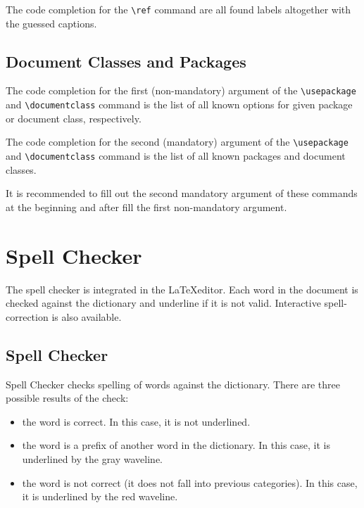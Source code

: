 \documentclass{article}
\begin{document}
\label{ssec:references}

The code completion for the \verb+\ref+ command are all found labels altogether with
the guessed captions.

\subsection{Document Classes and Packages}

\label{ssec:docclasses:packages}

The code completion for the first (non-mandatory) argument of the \verb+\usepackage+
and \verb+\documentclass+ command is the list of all known options for given package
or document class, respectively.

The code completion for the second (mandatory) argument of the \verb+\usepackage+
and \verb+\documentclass+ command is the list of all known packages and document
classes.

It is recommended to fill out the second mandatory argument of these
commands at the beginning and after fill the first non-mandatory argument.

\section{Spell Checker}
\label{sec:spell}

The spell checker is integrated in the \LaTeX editor. Each word in the document
is checked against the dictionary and underline if it is not valid. Interactive
spell-correction is also available.

\subsection{Spell Checker}

\label{ssec:spell:checker}

Spell Checker checks spelling of words against the dictionary. There are three
possible results of the check:

\begin{itemize}
\item{the word is correct. In this case, it is
not underlined.}
\item{the word is a prefix of another word in the dictionary. In this case, it is
underlined by the gray waveline.}
\item{the word is not correct (it does not fall into previous categories).
In this case, it is underlined by the red waveline.}
\end{itemize}
\end{document}
